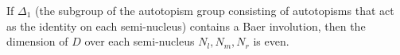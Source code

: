 If $\Delta_1$ (the subgroup of the autotopism group consisting of autotopisms that act as the identity on each semi-nucleus) contains a Baer involution, then the dimension of $D$ over each semi-nucleus $N_l, N_m, N_r$ is even.
